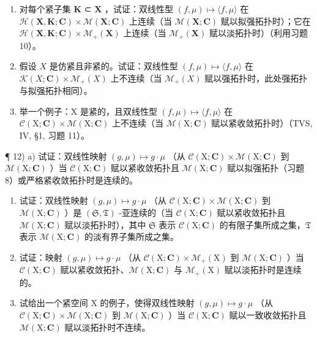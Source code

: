 \begin{enumerate}
\def\labelenumi{\alph{enumi})}
\setcounter{enumi}{1}
\item
  对每个紧子集 \(\mathbf{K}\) ⊂ \(\mathbf{X}\) ，试证：双线性型 \((f, \mu) \mapsto \langle f, \mu \rangle\) 在 \(\mathcal{H}(\mathbf{X}, \mathbf{K}; \mathbf{C}) \times \mathcal{M}(\mathbf{X}; \mathbf{C})\) 上连续（当 \(\mathcal{M}(\mathbf{X}; \mathbf{C})\) 赋以拟强拓扑时）；它在 \(\mathcal{H}(\mathbf{X}, \mathbf{K}; \mathbf{C}) \times \mathcal{M}_{+}(\mathbf{X})\) 上连续（当 \(\mathcal{M}_{+}(\mathbf{X})\) 赋以淡拓扑时）（利用习题 10）。
\item
  假设 \(X\) 是仿紧且非紧的。试证：双线性型 \((f, \mu) \mapsto \langle f, \mu \rangle\) 在 \(\mathcal{K}(X; \mathbf{C}) \times \mathcal{M}_{+}(X)\) 上不连续（当 \(\mathcal{M}_{+}(X)\) 赋以强拓扑时，此处强拓扑与拟强拓扑相同）。
\item
  举一个例子：X 是紧的，且双线性型 \((f,\mu)\mapsto\langle f,\mu\rangle\) 在 \(\mathcal{C}(\mathrm{X};\mathbf{C})\times\mathcal{M}(\mathrm{X};\mathbf{C})\) 上不连续（当 \(\mathcal{M}(\mathrm{X};\mathbf{C})\) 赋以紧收敛拓扑时）（TVS, IV, §1, 习题 11）。
\end{enumerate}

¶ 12) a) 试证：双线性映射 \((g, \mu) \mapsto g \cdot \mu\) （从 \(\mathcal{C}(\mathrm{X}; \mathbf{C}) \times \mathcal{M}(\mathrm{X}; \mathbf{C})\) 到 \(\mathcal{M}(\mathrm{X}; \mathbf{C})\) ）当 \(\mathcal{C}(\mathrm{X}; \mathbf{C})\) 赋以紧收敛拓扑且 \(\mathcal{M}(\mathrm{X};\mathbf{C})\) 赋以拟强拓扑（习题 8）或严格紧收敛拓扑时是连续的。

\begin{enumerate}
\def\labelenumi{\alph{enumi})}
\setcounter{enumi}{1}
\item
  试证：双线性映射 \((g,\mu)\mapsto g\cdot \mu\) （从 \(\mathcal{C}(\mathrm{X};\mathbf{C})\times \mathcal{M}(\mathrm{X};\mathbf{C})\) 到 \(\mathcal{M}(\mathrm{X};\mathbf{C})\) ）是 \((\mathfrak{S},\mathfrak{T})\) -亚连续的（当 \(\mathcal{C}(\mathrm{X};\mathbf{C})\) 赋以紧收敛拓扑且 \(\mathcal{M}(\mathrm{X};\mathbf{C})\) 赋以淡拓扑时），其中 \(\mathfrak{S}\) 表示 \(\mathcal{C}(\mathrm{X};\mathbf{C})\) 的有限子集所成之集，\(\mathfrak{T}\) 表示 \(\mathcal{M}(\mathrm{X};\mathbf{C})\) 的淡有界子集所成之集。
\item
  试证：映射 \((g, \mu) \mapsto g \cdot \mu\) （从 \(\mathcal{C}(\mathrm{X};\mathbf{C}) \times \mathcal{M}_{+}(\mathrm{X})\) 到 \(\mathcal{M}(\mathrm{X};\mathbf{C})\) ）当 \(\mathcal{C}(\mathrm{X};\mathbf{C})\) 赋以紧收敛拓扑、\(\mathcal{M}(\mathrm{X};\mathbf{C})\) 与 \(\mathcal{M}_{+}(\mathrm{X})\) 赋以淡拓扑时是连续的。
\item
  试给出一个紧空间 X 的例子，使得双线性映射 \((g,\mu)\mapsto g\cdot\mu\) （从 \(\mathcal{C}(\mathrm{X};\mathbf{C})\times\mathcal{M}(\mathrm{X};\mathbf{C})\) 到 \(\mathcal{M}(\mathrm{X};\mathbf{C})\) ）当 \(\mathcal{C}(\mathrm{X};\mathbf{C})\) 赋以一致收敛拓扑且 \(\mathcal{M}(\mathrm{X};\mathbf{C})\) 赋以淡拓扑时不连续。
\end{enumerate}


